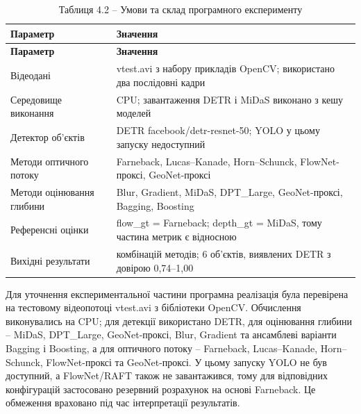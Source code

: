 \documentclass[
]{article}
\begin{document}
\begin{longtable}[]{@{}
  >{\raggedright\arraybackslash}p{}
  >{\raggedright\arraybackslash}p{}@{}}
\caption{\protect{}\label{_Ref226482723}{}Таблиця 4.2 -- Умови та склад програмного експерименту}\tabularnewline
\toprule\noalign{}
\begin{minipage}[b]{\linewidth}\raggedright
\textbf{Параметр}
\end{minipage} & \begin{minipage}[b]{\linewidth}\raggedright
\textbf{Значення}
\end{minipage} \\
\midrule\noalign{}
\endfirsthead
\toprule\noalign{}
\begin{minipage}[b]{\linewidth}\raggedright
\textbf{Параметр}
\end{minipage} & \begin{minipage}[b]{\linewidth}\raggedright
\textbf{Значення}
\end{minipage} \\
\midrule\noalign{}
\endhead
\bottomrule\noalign{}
\endlastfoot
Відеодані & vtest.avi з набору прикладів OpenCV; використано два послідовні кадри \\
Середовище виконання & CPU; завантаження DETR і MiDaS виконано з кешу моделей \\
Детектор об'єктів & DETR facebook/detr-resnet-50; YOLO у цьому запуску недоступний \\
Методи оптичного потоку & Farneback, Lucas--Kanade, Horn--Schunck, FlowNet-проксі, GeoNet-проксі \\
Методи оцінювання глибини & Blur, Gradient, MiDaS, DPT\_Large, GeoNet-проксі, Bagging, Boosting \\
Референсні оцінки & flow\_gt = Farneback; depth\_gt = MiDaS, тому частина метрик є відносною \\
Вихідні результати & 35 комбінацій методів; 6 об'єктів, виявлених DETR з довірою 0,74--1,00 \\
\end{longtable}

Для уточнення експериментальної частини програмна реалізація була перевірена на тестовому відеопотоці vtest.avi з бібліотеки OpenCV. Обчислення виконувались на CPU; для детекції використано DETR, для оцінювання глибини -- MiDaS, DPT\_Large, GeoNet-проксі, Blur, Gradient та ансамблеві варіанти Bagging і Boosting, а для оптичного потоку -- Farneback, Lucas--Kanade, Horn--Schunck, FlowNet-проксі та GeoNet-проксі. У цьому запуску YOLO не був доступний, а FlowNet/RAFT також не завантажився, тому для відповідних конфігурацій застосовано резервний розрахунок на основі Farneback. Це обмеження враховано під час інтерпретації результатів.
\end{document}
